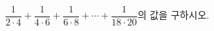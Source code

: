 \hspace*{2mm}\begin{minipage}[t]{\dimexpr\linewidth-2mm\relax}\vspace{0pt}
$\dfrac{1}{2\cdot 4}+\dfrac{1}{4\cdot 6}+\dfrac{1}{6\cdot 8}+\cdots+\dfrac{1}{18\cdot 20}$의 값을 구하시오.\end{minipage}
